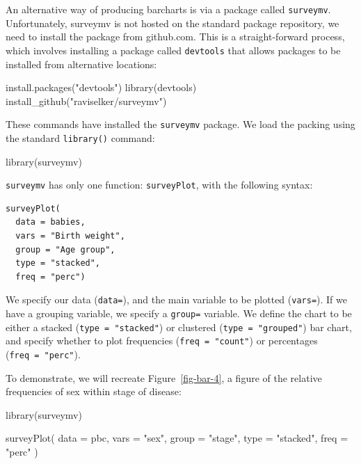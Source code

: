 \documentclass[
  a4paper,
]{memoir}
\newenvironment{Shaded}{\begin{snugshade}}{\end{snugshade}}
\newcommand{\AttributeTok}[1]{\textcolor[rgb]{0.00,0.00,0.00}{#1}}
\newcommand{\FunctionTok}[1]{\textcolor[rgb]{0.00,0.00,0.00}{#1}}
\newcommand{\NormalTok}[1]{\textcolor[rgb]{0.00,0.00,0.00}{#1}}
\newcommand{\StringTok}[1]{\textcolor[rgb]{0.00,0.00,0.00}{#1}}
\begin{document}
An alternative way of producing barcharts is via a package called
\texttt{surveymv}. Unfortunately, surveymv is not hosted on the standard
package repository, we need to install the package from github.com. This
is a straight-forward process, which involves installing a package
called \texttt{devtools} that allows packages to be installed from
alternative locations:

\begin{Shaded}
\begin{Highlighting}[]
\FunctionTok{install.packages}\NormalTok{(}\StringTok{"devtools"}\NormalTok{)}
\FunctionTok{library}\NormalTok{(devtools)}
\FunctionTok{install\_github}\NormalTok{(}\StringTok{"raviselker/surveymv"}\NormalTok{)}
\end{Highlighting}
\end{Shaded}

These commands have installed the \texttt{surveymv} package. We load the
packing using the standard \texttt{library()} command:

\begin{Shaded}
\begin{Highlighting}[]
\FunctionTok{library}\NormalTok{(surveymv)}
\end{Highlighting}
\end{Shaded}

\texttt{surveymv} has only one function: \texttt{surveyPlot}, with the
following syntax:

\begin{verbatim}
surveyPlot(
  data = babies,
  vars = "Birth weight",
  group = "Age group",
  type = "stacked",
  freq = "perc")
\end{verbatim}

We specify our data (\texttt{data=}), and the main variable to be
plotted (\texttt{vars=}). If we have a grouping variable, we specify a
\texttt{group=} variable. We define the chart to be either a stacked
(\texttt{type\ =\ "stacked"}) or clustered (\texttt{type\ =\ "grouped"})
bar chart, and specify whether to plot frequencies
(\texttt{freq\ =\ "count"}) or percentages (\texttt{freq\ =\ "perc"}).

To demonstrate, we will recreate Figure~\ref{fig-bar-4}, a figure of the
relative frequencies of sex within stage of disease:

\begin{Shaded}
\begin{Highlighting}[]
\FunctionTok{library}\NormalTok{(surveymv)}

\FunctionTok{surveyPlot}\NormalTok{(}
  \AttributeTok{data =}\NormalTok{ pbc,}
  \AttributeTok{vars =} \StringTok{"sex"}\NormalTok{,}
  \AttributeTok{group =} \StringTok{"stage"}\NormalTok{,}
  \AttributeTok{type =} \StringTok{"stacked"}\NormalTok{,}
  \AttributeTok{freq =} \StringTok{"perc"}
\NormalTok{)}
\end{Highlighting}
\end{Shaded}
\end{document}
